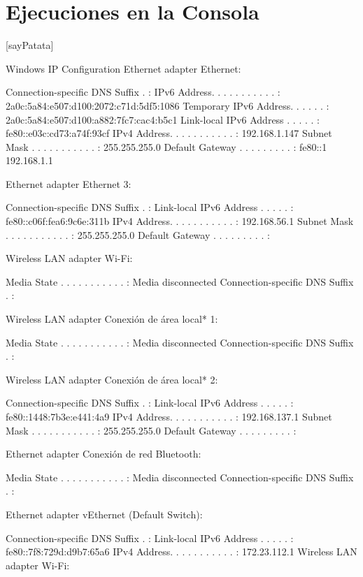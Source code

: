 \documentclass[CAT]{PECTeX}
\begin{document}
		\newpage
		\listofcodes
		
		\section{Ejecuciones en la Consola}
		
		
	[sayPatata]
	\newpage
	\listofconsoleprompts
		
		
{Windows IP Configuration
	Ethernet adapter Ethernet:
	
	Connection-specific DNS Suffix  . :
	IPv6 Address. . . . . . . . . . . : 2a0c:5a84:e507:d100:2072:c71d:5df5:1086
	Temporary IPv6 Address. . . . . . : 2a0c:5a84:e507:d100:a882:7fc7:cac4:b5c1
	Link-local IPv6 Address . . . . . : fe80::e03c:cd73:a74f:93cf%
	IPv4 Address. . . . . . . . . . . : 192.168.1.147
	Subnet Mask . . . . . . . . . . . : 255.255.255.0
	Default Gateway . . . . . . . . . : fe80::1%
	192.168.1.1
	
	Ethernet adapter Ethernet 3:
	
	Connection-specific DNS Suffix  . :
	Link-local IPv6 Address . . . . . : fe80::c06f:fea6:9c6e:311b%
	IPv4 Address. . . . . . . . . . . : 192.168.56.1
	Subnet Mask . . . . . . . . . . . : 255.255.255.0
	Default Gateway . . . . . . . . . :
	
	Wireless LAN adapter Wi-Fi:
	
	Media State . . . . . . . . . . . : Media disconnected
	Connection-specific DNS Suffix  . :
	
	Wireless LAN adapter Conexión de área local* 1:
	
	Media State . . . . . . . . . . . : Media disconnected
	Connection-specific DNS Suffix  . :
	
	Wireless LAN adapter Conexión de área local* 2:
	
	Connection-specific DNS Suffix  . :
	Link-local IPv6 Address . . . . . : fe80::1448:7b3e:e441:4a9%
	IPv4 Address. . . . . . . . . . . : 192.168.137.1
	Subnet Mask . . . . . . . . . . . : 255.255.255.0
	Default Gateway . . . . . . . . . :
	
	Ethernet adapter Conexión de red Bluetooth:
	
	Media State . . . . . . . . . . . : Media disconnected
	Connection-specific DNS Suffix  . :
	
	Ethernet adapter vEthernet (Default Switch):
	
	Connection-specific DNS Suffix  . :
	Link-local IPv6 Address . . . . . : fe80::7f8:729d:d9b7:65a6%
	IPv4 Address. . . . . . . . . . . : 172.23.112.1
	Wireless LAN adapter Wi-Fi:
	
}
\end{document}
